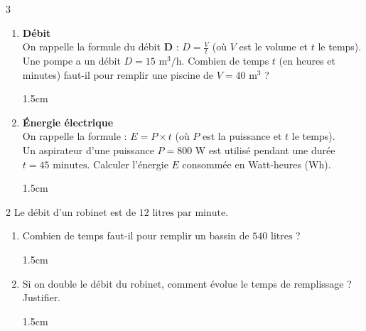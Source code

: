 \documentclass[a4paper]{book}
\begin{document}
{\begin{exerciceNote}{3}
\begin{enumerate}[leftmargin=*]
            \begin{ZoneReponse}{1.5cm}                
            \end{ZoneReponse}
            
            \item \textbf{Débit} \\
            On rappelle la formule du débit \textbf{D} : $D = \frac{V}{t}$ (où $V$ est le volume et $t$ le temps). \\
            Une pompe a un débit $D = 15 \text{ m}^3\text{/h}$. Combien de temps $t$ (en heures et minutes) faut-il pour remplir une piscine de $V = 40 \text{ m}^3$ ?

            \begin{ZoneReponse}{1.5cm}                
            \end{ZoneReponse}

\newpage
            
            \item \textbf{Énergie électrique} \\
            On rappelle la formule : $E = P \times t$ (où $P$ est la puissance et $t$ le temps). \\
            Un aspirateur d'une puissance $P = 800 \text{ W}$ est utilisé pendant une durée $t = 45 \text{ minutes}$. 
            Calculer l'énergie $E$ consommée en Watt-heures (Wh).

            \begin{ZoneReponse}{1.5cm}                
            \end{ZoneReponse}
        \end{enumerate}
    \end{exerciceNote}


    \begin{exerciceNote}{2}
        Le débit d'un robinet est de $12 \text{ litres par minute}$.
        \begin{enumerate}[leftmargin=*]
            \item 
            Combien de temps faut-il pour remplir un bassin de $540 \text{ litres}$ ? 
            \begin{ZoneReponse}{1.5cm}                
            \end{ZoneReponse}

            \item Si on double le débit du robinet, comment évolue le temps de remplissage ? Justifier.
            \begin{ZoneReponse}{1.5cm}                
            \end{ZoneReponse}
        \end{enumerate}
    \end{exerciceNote}


}
\end{document}
